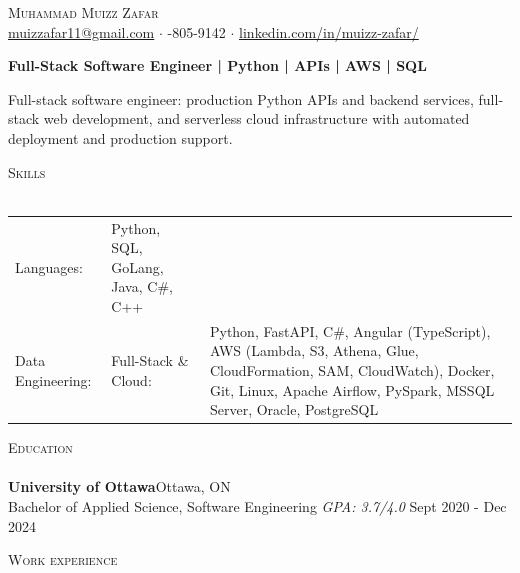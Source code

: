 \documentclass[a4paper]{article}
\newcommand{\lineunder} {
    \vspace*{-8pt} \\
    \hspace*{-18pt} \hrulefill \\
}
\newcommand{\header} [1] {
    {\hspace*{-18pt}\vspace*{6pt} \textsc{#1}}
    \vspace*{-6pt} \lineunder
}
\begin{document}
\vspace*{-40pt}

    

\vspace*{-10pt}
\begin{center}
	{\Huge \scshape {Muhammad Muizz Zafar}}\\
	\faSend \space \href{mailto:muizzafar11@gmail.com}{muizzafar11@gmail.com} $\cdot$ \faPhoneSquare {}-805-9142 $\cdot$ \faLinkedinSquare \space \href{https://www.linkedin.com/in/muizz-zafar/}{linkedin.com/in/muizz-zafar/}
	\\
\end{center}


\vspace{-5pt}
\begin{center}
\textbf{Full-Stack Software Engineer | Python | APIs | AWS | SQL}
\end{center}
\begin{center}
Full-stack software engineer: production Python APIs and backend services, full-stack web development, and serverless cloud infrastructure with automated deployment and production support.
\end{center}

\header{Skills}
\begin{tabular}{ l l }
	Languages: 
& Python, SQL, GoLang, Java, C\#, C++ \\

Data Engineering: 
& Full-Stack \& Cloud: 
& Python, FastAPI, C\#, Angular (TypeScript), AWS (Lambda, S3, Athena, Glue, CloudFormation, SAM, CloudWatch), Docker, Git, Linux, Apache Airflow, PySpark, MSSQL Server, Oracle, PostgreSQL

\end{tabular}

\header{Education}
\textbf{University of Ottawa}\hfill Ottawa, ON\\
Bachelor of Applied Science, Software Engineering \textit{GPA: 3.7/4.0} \hfill Sept 2020 - Dec 2024\\
\vspace{2mm}

\header{Work experience}
\vspace{1.5mm}
\end{document}
